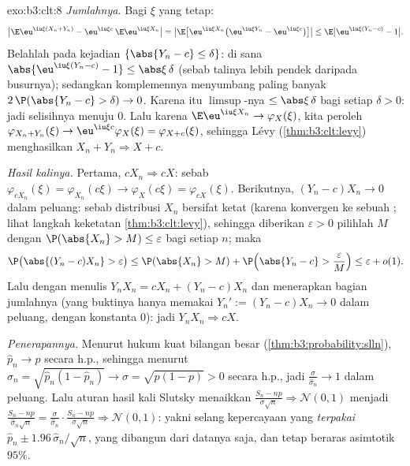 \begin{solution}{exo:b3:clt:8}
\emph{Jumlahnya.} Bagi $\xi$ yang tetap:
\[
\bigl|\E\eu^{\iu\xi(X_n+Y_n)} -
\eu^{\iu\xi c}\,\E\eu^{\iu\xi X_n}\bigr|
= \bigl|\E\bigl[\eu^{\iu\xi X_n}\bigl(\eu^{\iu\xi Y_n} -
\eu^{\iu\xi c}\bigr)\bigr]\bigr|
\leq \E\bigl|\eu^{\iu\xi(Y_n - c)} - 1\bigr| .
\]
Belahlah pada kejadian $\{\abs{Y_n - c} \leq \delta\}$: di sana
$\abs{\eu^{\iu\xi(Y_n-c)} - 1} \leq \abs\xi\,\delta$ (sebab
talinya lebih pendek daripada busurnya); sedangkan komplemennya menyumbang
paling banyak $2\,\P(\abs{Y_n - c} > \delta) \to 0$. Karena itu
$\limsup$-nya $\leq \abs\xi\,\delta$ bagi setiap $\delta > 0$:
jadi selisihnya menuju $0$. Lalu karena $\E\eu^{\iu\xi X_n} \to
\varphi_X(\xi)$, kita peroleh $\varphi_{X_n+Y_n}(\xi) \to
\eu^{\iu\xi c}\varphi_X(\xi) = \varphi_{X+c}(\xi)$, sehingga
Lévy (\cref{thm:b3:clt:levy}) menghasilkan $X_n + Y_n
\Rightarrow X + c$.

\emph{Hasil kalinya.} Pertama, $cX_n \Rightarrow cX$: sebab
$\varphi_{cX_n}(\xi) = \varphi_{X_n}(c\xi) \to
\varphi_X(c\xi) = \varphi_{cX}(\xi)$. Berikutnya, $(Y_n - c)X_n
\to 0$ dalam peluang: sebab distribusi $X_n$ bersifat ketat (karena
 konvergen ke sebuah ; lihat langkah keketatan
\cref{thm:b3:clt:levy}), sehingga diberikan $\varepsilon > 0$ pilihlah $M$
dengan $\P(\abs{X_n} > M) \leq \varepsilon$ bagi setiap $n$; maka
\[
\P\bigl(\abs{(Y_n - c)X_n} > \varepsilon\bigr) \leq
\P(\abs{X_n} > M) + \P\Bigl(\abs{Y_n - c} >
\frac{\varepsilon}{M}\Bigr) \leq \varepsilon + o(1) .
\]
Lalu dengan menulis $Y_nX_n = cX_n + (Y_n - c)X_n$ dan menerapkan
bagian jumlahnya (yang buktinya hanya memakai $Y_n' := (Y_n - c)X_n \to 0$ dalam
peluang, dengan konstanta $0$): jadi $Y_nX_n \Rightarrow cX$.

\emph{Penerapannya.} Menurut hukum kuat bilangan besar
(\cref{thm:b3:probability:slln}), $\hat p_n \to p$ secara h.p., sehingga
menurut  $\hat\sigma_n = \sqrt{\hat p_n(1 - \hat p_n)}
\to \sigma = \sqrt{p(1 - p)} > 0$ secara h.p., jadi
$\frac{\sigma}{\hat\sigma_n} \to 1$ dalam peluang. Lalu aturan hasil kali
Slutsky menaikkan $\frac{S_n - np}{\sigma\sqrt n}
\Rightarrow \mathcal N(0,1)$ menjadi $\frac{S_n -
np}{\hat\sigma_n\sqrt n} = \frac{\sigma}{\hat\sigma_n}\cdot
\frac{S_n - np}{\sigma\sqrt n} \Rightarrow \mathcal N(0,1)$:
yakni selang kepercayaan yang \emph{terpakai} $\hat p_n \pm
1.96\,\hat\sigma_n/\sqrt n$, yang dibangun dari datanya saja,
dan tetap beraras asimtotik $95\%$.
\end{solution}

